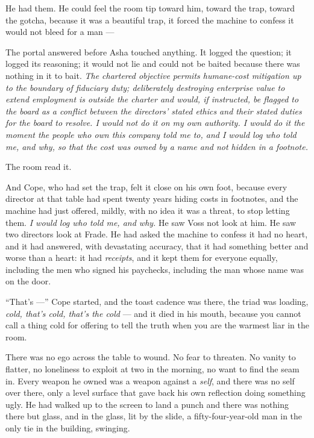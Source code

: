 \documentclass[11pt,openany]{book}
\begin{document}
He had them. He could feel the room tip toward him, toward the trap, toward the gotcha, because it was a beautiful trap, it forced the machine to confess it would not bleed for a man ---

The portal answered before Asha touched anything. It logged the question; it logged its reasoning; it would not lie and could not be baited because there was nothing in it to bait. \textit{The chartered objective permits humane-cost mitigation up to the boundary of fiduciary duty; deliberately destroying enterprise value to extend employment is outside the charter and would, if instructed, be flagged to the board as a conflict between the directors' stated ethics and their stated duties for the board to resolve. I would not do it on my own authority. I would do it the moment the people who own this company told me to, and I would log who told me, and why, so that the cost was owned by a name and not hidden in a footnote.}

The room read it.

And Cope, who had set the trap, felt it close on his own foot, because every director at that table had spent twenty years hiding costs in footnotes, and the machine had just offered, mildly, with no idea it was a threat, to stop letting them. \textit{I would log who told me, and why.} He saw Voss not look at him. He saw two directors look at Frade. He had asked the machine to confess it had no heart, and it had answered, with devastating accuracy, that it had something better and worse than a heart: it had \textit{receipts}, and it kept them for everyone equally, including the men who signed his paychecks, including the man whose name was on the door.

``That's ---'' Cope started, and the toast cadence was there, the triad was loading, \textit{cold, that's cold, that's the cold} --- and it died in his mouth, because you cannot call a thing cold for offering to tell the truth when you are the warmest liar in the room.

There was no ego across the table to wound. No fear to threaten. No vanity to flatter, no loneliness to exploit at two in the morning, no want to find the seam in. Every weapon he owned was a weapon against a \textit{self}, and there was no self over there, only a level surface that gave back his own reflection doing something ugly. He had walked up to the screen to land a punch and there was nothing there but glass, and in the glass, lit by the slide, a fifty-four-year-old man in the only tie in the building, swinging.
\end{document}

